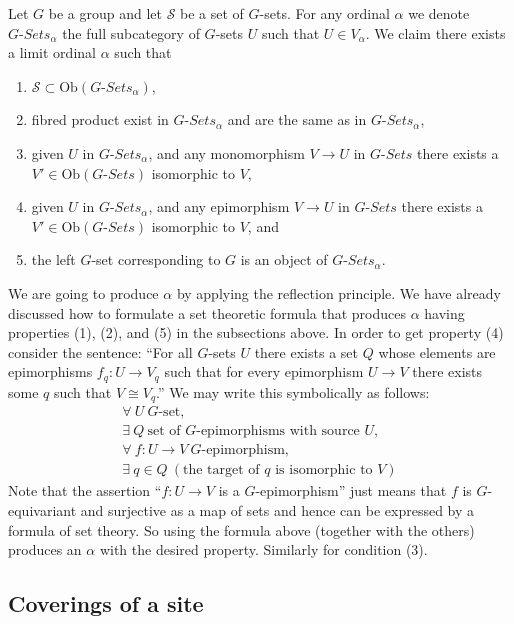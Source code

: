 \noindent
Let $G$ be a group and let $\mathcal{S}$ be a 
set of $G$-sets. For any ordinal $\alpha$ we denote
$G\textit{-Sets}_\alpha$ the full subcategory of $G$-sets
$U$ such that $U \in V_\alpha$. We claim there exists a limit
ordinal $\alpha$ such that
\begin{enumerate}
\item $\mathcal{S} \subset \text{Ob}(G\textit{-Sets}_\alpha)$,
\item fibred product exist in $G\textit{-Sets}_\alpha$
and are the same as in $G\textit{-Sets}_\alpha$,
\item given $U$ in $G\textit{-Sets}_\alpha$, and any monomorphism
$V \to U$ in $G\textit{-Sets}$ there exists a
$V' \in \text{Ob}(G\textit{-Sets})$ isomorphic to $V$,
\item given $U$ in $G\textit{-Sets}_\alpha$, and any epimorphism
$V \to U$ in $G\textit{-Sets}$ there exists a
$V' \in \text{Ob}(G\textit{-Sets})$ isomorphic to $V$, and
\item the left $G$-set corresponding to $G$ is an object of
$G\textit{-Sets}_\alpha$.
\end{enumerate}
We are going to produce $\alpha$ by applying the reflection
principle. We have already discussed how to formulate a set
theoretic formula that produces $\alpha$ having properties
(1), (2), and (5) in the subsections above. In order to 
get property (4) consider the sentence: ``For all $G$-sets
$U$ there exists a set $Q$ whose elements are epimorphisms
$f_q : U \to V_q$ such that for every epimorphism $U \to V$
there exists some $q$ such that $V \cong V_q$.'' We may write
this symbolically as follows:
\begin{eqnarray*}
\forall\ U\ \text{$G$-set},\\
\exists\ Q\ \text{set of $G$-epimorphisms with source $U$},\\
\forall\ f : U\to V\ \text{$G$-epimorphism},\\
\exists\ q \in Q\ (\text{the target of $q$ is isomorphic to $V$})
\end{eqnarray*}
Note that the assertion ``$f : U \to V$ is a $G$-epimorphism'' just
means that $f$ is $G$-equivariant and surjective as a map of sets
and hence can be expressed by a formula of set theory. So using
the formula above (together with the others) produces an $\alpha$
with the desired property. Similarly for condition (3).

\subsection{Coverings of a site}
\label{subsection-coverings-site}

